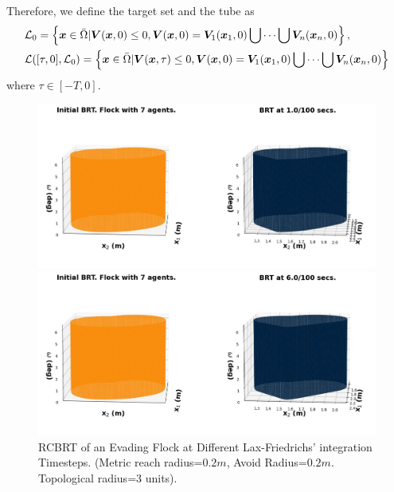 %
Therefore, we define the target set and the tube as
%
\begin{align}
	&\mathcal{L}_0 = \left\{ \bm{x} \in \bar{\Omega} | \bm{V}(\bm{x}, 0) \le 0, \bm{V}(\bm{x}, 0) = \bm{V}_1(\bm{x}_1, 0) \bigcup \cdots \bigcup \bm{V}_n(\bm{x}_n, 0)\right\} , \\
	&\mathcal{L}([\tau, 0],  \mathcal{L}_0) = \left\{\bm{x}\in \bar{\Omega}  | \bm{V}(\bm{x}, \tau) \le 0, \bm{V}(\bm{x}, 0) = \bm{V}_1(\bm{x}_1, 0) \bigcup \cdots \bigcup \bm{V}_n(\bm{x}_n, 0)\right\} \nonumber
\end{align}
%
where $\tau \in  [-T, 0]$. 

\begin{figure}[tb!]
	\centering
	\begin{minipage}[b]{\textwidth}		
		\includegraphics[width=\textwidth]{figures/murmurations_2.0.jpg} 
	\end{minipage}
	\begin{minipage}[b]{\textwidth}		
		\includegraphics[width=\textwidth]{figures/murmurations_7.0.jpg} 
	\end{minipage}
	\caption{\footnotesize RCBRT of an Evading Flock at Different Lax-Friedrichs' integration Timesteps.   
		(Metric reach radius=$0.2m$, Avoid Radius=$0.2m$. Topological radius=3 units).} 
	\label{fig:flocks_rcbrt}
\end{figure}
